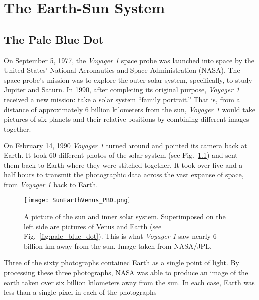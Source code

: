 
\chapter{\label{ch:earth_sun}The Earth-Sun System} 

\section{\label{sec:pbd}The Pale Blue Dot}

On September 5, 1977, the \emph{Voyager 1} space probe was launched into space by the United States' National Aeronautics and Space Administration (NASA). The space probe's mission was to explore the outer solar system, specifically, to study Jupiter and Saturn. In 1990, after completing its original purpose,  \emph{Voyager 1} received a new mission: take a solar system ``family portrait.'' That is, from a distance of approximately 6 billion kilometers from the sun, \emph{Voyager 1} would take pictures of six planets and their relative positions by combining different images together.

On February 14, 1990  \emph{Voyager 1} turned around and pointed its camera back at Earth. It took 60 different photos of the solar system (see Fig.~\ref{fig:EarthSunVenus}) and sent them back to Earth where they were stitched together. It took over five and a half hours to transmit the photographic data across the vast expanse of space, from \emph{Voyager 1} back to Earth. 

    \begin{figure}[ht]
    \centering
\texttt{[image: SunEarthVenus\_PBD.png]}

        \caption{A picture of the sun and inner solar system. Superimposed on the left side are pictures of Venus and Earth (see Fig.~\ref{fig:pale_blue_dot}). This is what \emph{Voyager 1} saw nearly 6 billion \si{\km} away from the sun. Image taken from NASA/JPL.}
        \label{fig:EarthSunVenus}
    \end{figure}

Three of the sixty photographs contained Earth as a single point of light. By processing these three photographs, NASA was able to produce an image of the earth taken over six billion kilometers away from the sun. In each case, Earth was less than a single pixel in each of the photographs %

